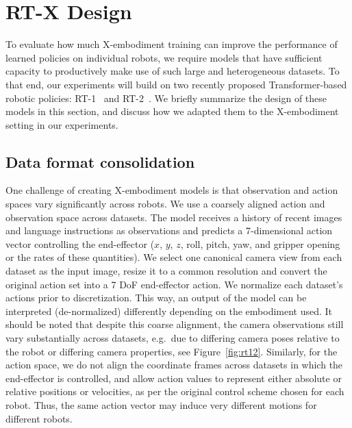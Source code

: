 \documentclass[letterpaper, 10 pt, conference]{ieeeconf}  %
\newcommand{\cro}{X}
\begin{document}
\vspace{-0.2em}
\section{RT-X Design}
\vspace{-0.16em}

To evaluate how much \cro-embodiment training can improve the performance of learned policies on individual robots, we require models that have sufficient capacity to productively make use of such large and heterogeneous datasets. To that end, our experiments will build on two recently proposed Transformer-based robotic policies: RT-1~\cite{brohan2023rt1} and RT-2~\cite{brohan2023rt2}. We briefly summarize the design of these models in this section, and discuss how we adapted them to the \cro-embodiment setting in our experiments.

\vspace{-0.3em}
\subsection{Data format consolidation}
\vspace{-0.15em}
One challenge of creating \cro-embodiment models is that observation and action spaces vary significantly across robots.
We use a coarsely aligned action and observation space across datasets.
The model receives a history of recent images and language instructions as observations
and predicts a 7-dimensional action vector controlling the end-effector ($x$, $y$, $z$, roll, pitch, yaw, and gripper opening or the rates of these quantities). We select one canonical camera view from each dataset as the input image, resize it to a common resolution and convert the original action set into a 7 DoF end-effector action. 
We normalize each dataset's actions prior to discretization.
This way, an output of the model can be interpreted (de-normalized) differently depending on the embodiment used.
It should be noted that despite this coarse alignment, the camera observations still vary substantially across datasets, e.g.\ due to differing camera poses relative to the robot or differing camera properties, see Figure~\ref{fig:rt12}.
Similarly, for the action space, we do not align the coordinate frames across datasets in which the end-effector is controlled, and allow action values to represent either absolute or relative positions or velocities, as per the original control scheme chosen for each robot. 
Thus, the same action vector may induce very different motions for different robots.
\end{document}

